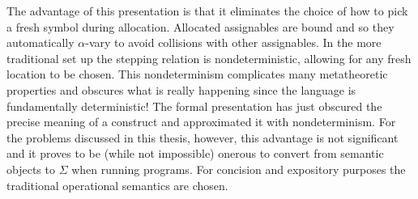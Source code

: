 The advantage of this presentation is that it eliminates the choice of
how to pick a fresh symbol during allocation. Allocated assignables
are bound and so they automatically $\alpha$-vary to avoid collisions
with other assignables. In the more traditional set up the stepping
relation is nondeterministic, allowing for any fresh location to be
chosen. This nondeterminism complicates many metatheoretic properties
and obscures what is really happening since the language is
fundamentally deterministic! The formal presentation has just obscured
the precise meaning of a construct and approximated it with
nondeterminism. For the problems discussed in this thesis, however,
this advantage is not significant and it proves to be (while not
impossible) onerous to convert from semantic objects to $\Sigma$ when
running programs. For concision and expository purposes the
traditional operational semantics are chosen.
